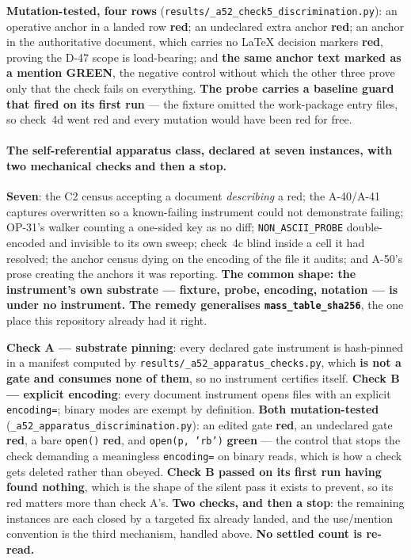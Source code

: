 \documentclass[
  10pt,
]{article}
\begin{document}
\textbf{Mutation-tested, four rows} (\texttt{results/\allowbreak{}\_a52\_check5\_discrimination.py}): an operative anchor in a landed row \textbf{red}; an undeclared extra anchor \textbf{red}; an anchor in the authoritative document, which carries no LaTeX decision markers \textbf{red}, proving the D-47 scope is load-bearing; and \textbf{the same anchor text marked as a mention GREEN}, the negative control without which the other three prove only that the check fails on everything. \textbf{The probe carries a baseline guard that fired on its first run} --- the fixture omitted the work-package entry files, so check~4d went red and every mutation would have been red for free.

\paragraph{The self-referential apparatus class, declared at seven instances, with two mechanical checks and then a stop.}
\textbf{Seven}: the C2 census accepting a document \emph{describing} a red; the A-40/A-41 captures overwritten so a known-failing instrument could not demonstrate failing; OP-31's walker counting a one-sided key as no diff; \texttt{NON\_ASCII\_PROBE} double-encoded and invisible to its own sweep; check~4c blind inside a cell it had resolved; the anchor census dying on the encoding of the file it audits; and A-50's prose creating the anchors it was reporting. \textbf{The common shape: the instrument's own substrate --- fixture, probe, encoding, notation --- is under no instrument.} \textbf{The remedy generalises \texttt{mass\_table\_sha256}}, the one place this repository already had it right.

\textbf{Check A --- substrate pinning}: every declared gate instrument is hash-pinned in a manifest computed by \texttt{results/\allowbreak{}\_a52\_apparatus\_checks.py}, which \textbf{is not a gate and consumes none of them}, so no instrument certifies itself. \textbf{Check B --- explicit encoding}: every document instrument opens files with an explicit \texttt{encoding=}; binary modes are exempt by definition. \textbf{Both mutation-tested} (\texttt{\_a52\_apparatus\_discrimination.py}): an edited gate \textbf{red}, an undeclared gate \textbf{red}, a bare \texttt{open()} \textbf{red}, and \texttt{open(p,\,'rb')} \textbf{green} --- the control that stops the check demanding a meaningless \texttt{encoding=} on binary reads, which is how a check gets deleted rather than obeyed. \textbf{Check B passed on its first run having found nothing}, which is the shape of the silent pass it exists to prevent, so its red matters more than check A's. \textbf{Two checks, and then a stop}: the remaining instances are each closed by a targeted fix already landed, and the use/mention convention is the third mechanism, handled above. \textbf{No settled count is re-read.}
\end{document}
